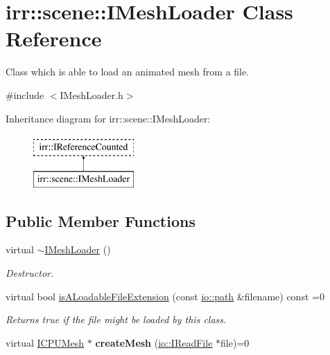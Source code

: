 \hypertarget{classirr_1_1scene_1_1IMeshLoader}{}\section{irr\+:\+:scene\+:\+:I\+Mesh\+Loader Class Reference}
\label{classirr_1_1scene_1_1IMeshLoader}


Class which is able to load an animated mesh from a file.  




{\ttfamily \#include $<$I\+Mesh\+Loader.\+h$>$}

Inheritance diagram for irr\+:\+:scene\+:\+:I\+Mesh\+Loader\+:\begin{figure}[H]
\begin{center}
\leavevmode
\includegraphics[height=2.000000cm]{classirr_1_1scene_1_1IMeshLoader}
\end{center}
\end{figure}
\subsection*{Public Member Functions}
\begin{DoxyCompactItemize}
\item 
virtual \hyperlink{classirr_1_1scene_1_1IMeshLoader_ad20920b323a9902d50e8d09211730d4d}{$\sim$\+I\+Mesh\+Loader} ()\hypertarget{classirr_1_1scene_1_1IMeshLoader_ad20920b323a9902d50e8d09211730d4d}{}\label{classirr_1_1scene_1_1IMeshLoader_ad20920b323a9902d50e8d09211730d4d}

\begin{DoxyCompactList}\small\item\em Destructor. \end{DoxyCompactList}\item 
virtual bool \hyperlink{classirr_1_1scene_1_1IMeshLoader_aab617e979ee6bb774b87f30b8eeaf157}{is\+A\+Loadable\+File\+Extension} (const \hyperlink{namespaceirr_1_1io_ab1bdc45edb3f94d8319c02bc0f840ee1}{io\+::path} \&filename) const  =0
\begin{DoxyCompactList}\small\item\em Returns true if the file might be loaded by this class. \end{DoxyCompactList}\item 
virtual \hyperlink{classirr_1_1scene_1_1IMesh}{I\+C\+P\+U\+Mesh} $\ast$ {\bfseries create\+Mesh} (\hyperlink{classirr_1_1io_1_1IReadFile}{io\+::\+I\+Read\+File} $\ast$file)=0\hypertarget{classirr_1_1scene_1_1IMeshLoader_aa94557000cc544d270da072fbe059af6}{}\label{classirr_1_1scene_1_1IMeshLoader_aa94557000cc544d270da072fbe059af6}

\end{DoxyCompactItemize}
